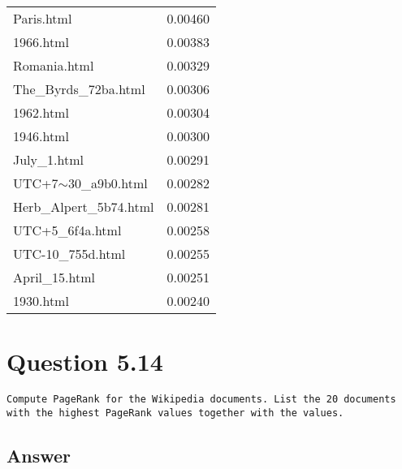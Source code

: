 \documentclass[11pt]{article}
\newenvironment{code}{\captionsetup{type=listing}}{}
\begin{document}
\begin{table}[h]
\begin{minipage}{0.5\textwidth}
\begin{tabular}{lc}
Paris.html & 0.00460 \\
1966.html & 0.00383 \\
Romania.html & 0.00329 \\
The\_Byrds\_72ba.html & 0.00306 \\
1962.html & 0.00304 \\
1946.html & 0.00300 \\
July\_1.html & 0.00291 \\
UTC+7$\sim$30\_a9b0.html & 0.00282 \\
Herb\_Alpert\_5b74.html & 0.00281 \\
UTC+5\_6f4a.html & 0.00258 \\
UTC-10\_755d.html & 0.00255 \\
April\_15.html & 0.00251 \\
1930.html & 0.00240
\end{tabular}
\end{minipage}
\end{table}
\newpage
\begin{code}
	 \label{code:pr}
\end{code}

\newpage
\section{Question 5.14}
\begin{verbatim}
Compute PageRank for the Wikipedia documents. List the 20 documents
with the highest PageRank values together with the values.
\end{verbatim}
\subsection{Answer}
\begin{code}
	 \label{code:vcp}
\end{code}
\newpage
\begin{code}
	 \label{code:vcr}
\end{code}
\newpage
\begin{code}
	 \label{code:util}
\end{code}
\end{document}
